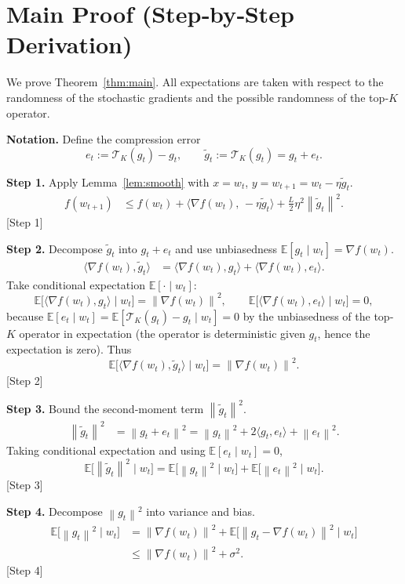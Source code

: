 \documentclass{article}
\newcommand{\E}{\mathbb{E}}
\newcommand{\norm}[1]{\left\|#1\right\|}
\newcommand{\topk}[1]{\mathcal{T}_K\!\left(#1\right)}
\begin{document}
\section*{Main Proof (Step‑by‑Step Derivation)}
We prove Theorem~\ref{thm:main}. All expectations are taken with respect to the randomness of the stochastic gradients and the possible randomness of the top‑$K$ operator.

\noindent\textbf{Notation.} Define the compression error
\[
e_t := \topk{g_t}-g_t,\qquad \tilde g_t:=\topk{g_t}=g_t+e_t .
\]

\noindent\textbf{Step 1.} Apply Lemma~\ref{lem:smooth} with $x=w_t$, $y=w_{t+1}=w_t-\eta\tilde g_t$.
\[
\begin{aligned}
f(w_{t+1})
&\le f(w_t)+\langle \nabla f(w_t),\, -\eta\tilde g_t\rangle
   +\frac{L}{2}\eta^{2}\norm{\tilde g_t}^{2}. \tag{1}
\end{aligned}
\]
[Step 1]

\noindent\textbf{Step 2.} Decompose $\tilde g_t$ into $g_t+e_t$ and use unbiasedness $\E[g_t\mid w_t]=\nabla f(w_t)$.
\[
\begin{aligned}
\langle \nabla f(w_t),\tilde g_t\rangle
&= \langle \nabla f(w_t),g_t\rangle+\langle \nabla f(w_t),e_t\rangle.
\end{aligned}
\]
Take conditional expectation $\E[\cdot\mid w_t]$:
\[
\E\!\bigl[\langle \nabla f(w_t),g_t\rangle\mid w_t\bigr]
   =\norm{\nabla f(w_t)}^{2},\qquad
\E\!\bigl[\langle \nabla f(w_t),e_t\rangle\mid w_t\bigr]=0,
\]
because $\E[e_t\mid w_t]=\E[\topk{g_t}-g_t\mid w_t]=0$ by the unbiasedness of the top‑$K$ operator in expectation (the operator is deterministic given $g_t$, hence the expectation is zero).  
Thus
\[
\E\!\bigl[\langle \nabla f(w_t),\tilde g_t\rangle\mid w_t\bigr]
   =\norm{\nabla f(w_t)}^{2}. \tag{2}
\]
[Step 2]

\noindent\textbf{Step 3.} Bound the second‑moment term $\norm{\tilde g_t}^{2}$.
\[
\begin{aligned}
\norm{\tilde g_t}^{2}
&= \norm{g_t+e_t}^{2}
 = \norm{g_t}^{2}+2\langle g_t,e_t\rangle+\norm{e_t}^{2}.
\end{aligned}
\]
Taking conditional expectation and using $\E[e_t\mid w_t]=0$,
\[
\E\!\bigl[\norm{\tilde g_t}^{2}\mid w_t\bigr]
   =\E\!\bigl[\norm{g_t}^{2}\mid w_t\bigr]
    +\E\!\bigl[\norm{e_t}^{2}\mid w_t\bigr]. \tag{3}
\]
[Step 3]

\noindent\textbf{Step 4.} Decompose $\norm{g_t}^{2}$ into variance and bias.
\[
\begin{aligned}
\E\!\bigl[\norm{g_t}^{2}\mid w_t\bigr]
&= \norm{\nabla f(w_t)}^{2}
   +\E\!\bigl[\norm{g_t-\nabla f(w_t)}^{2}\mid w_t\bigr]\\
&\le \norm{\nabla f(w_t)}^{2}+\sigma^{2}. \tag{4}
\end{aligned}
\]
[Step 4]
\end{document}

